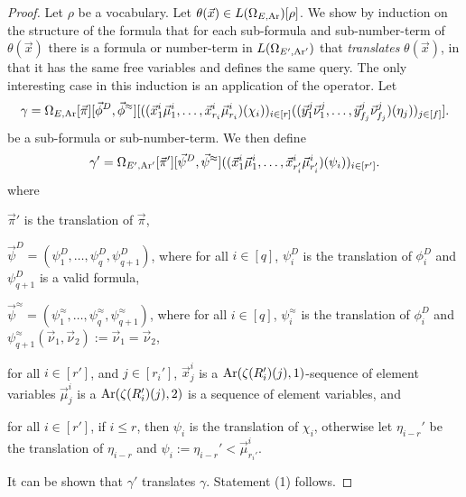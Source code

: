 \documentclass[../main/thesis.tex]{subfiles}
\begin{document}
\begin{proof}
  Let $\rho$ be a vocabulary. Let $\theta(\vec{x}) \in L(\Omega_{E,
    \text{\upshape Ar}})[\rho]$. We show by induction on the structure of the formula that for
  each sub-formula and sub-number-term of $\theta(\vec{x})$ there is a formula
  or number-term in $L(\Omega_{E', \text{\upshape Ar}'})$ that \emph{translates}
  $\theta(\vec{x})$, in that it has the same free variables and defines the same
  query. The only interesting case in this induction is an application of the
  operator. Let
  \begin{align*}
    \gamma = \Omega_{E, \text{\upshape Ar}} [\vec{\pi}] [\vec{\phi}^D, \vec{\phi}^{\approx}]  [((\vec{x}^i_1 \vec{\mu}^i_1, \ldots, \vec{x}^i_{r_i} \vec{\mu}^i_{r_i})(\chi_i))_{i \in [r]}((\vec{y}^j_1 \vec{\nu}^j_1, \ldots, \vec{y}^j_{f_j} \vec{\nu}^j_{f_j})(\eta_j))_{j \in [f]}].
  \end{align*}
  be a sub-formula or sub-number-term. We then define
  \begin{align*}
    \gamma' = \Omega_{E', \text{\upshape Ar}'}[\vec{\pi}'][\vec{\psi}^D, \vec{\psi}^{\approx}] ((\vec{x}^i_1 \vec{\mu}^i_1, \ldots, \vec{x}^i_{r_i'} \vec{\mu}^i_{r_i'})(\psi_i))_{i \in [r']}.
  \end{align*}
  where
  \begin{myitemize}
  \item $\vec{\pi}'$ is the translation of $\vec{\pi}$,
  \item $\vec{\psi}^D = (\psi^D_1, \ldots, \psi^D_{q}, \psi^D_{q+1})$, where for
    all $i \in [q]$, $\psi^D_i$ is the translation of $\phi^D_i$ and
    $\psi^D_{q+1}$ is a valid formula,
  \item $\vec{\psi}^{\approx} = (\psi^{\approx}_1, \ldots, \psi^{\approx}_q,
    \psi^{\approx}_{q+1})$, where for all $i \in [q]$, $\psi^{\approx}_i$ is the
    translation of $\phi^D_i$ and $\psi^{\approx}_{q+1}(\vec{\nu}_1,
    \vec{\nu}_2) := \vec{\nu}_1 = \vec{\nu}_2$,
  \item for all $i \in [r']$, and $j \in [r_i']$, $\vec{x}^i_j$ is a
    $\text{\upshape Ar}(\zeta(R_i')(j), 1)$-sequence of element variables $\vec{\mu}^i_j$ is a
    $\text{\upshape Ar}(\zeta(R_i')(j), 2)$ is a sequence of element variables, and
  \item for all $i \in [r']$, if $i \leq r$, then $\psi_i$ is the translation of
    $\chi_i$, otherwise let $\eta_{i - r}'$ be the translation of $\eta_{i - r}$
    and $\psi_i := \eta_{i-r}' < \vec{\mu}^i_{r_i'}$.
  \end{myitemize}
  It can be shown that $\gamma'$ translates $\gamma$. Statement (1) follows.


\end{proof}
\end{document}
